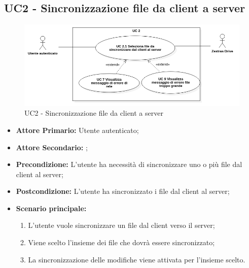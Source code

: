 \subsection{UC2 - Sincronizzazione file da client a server}
\begin{figure}[H]
    \centering
    \includegraphics[scale = 0.6]{components/img/UC2.png}
    \caption{UC2 - Sincronizzazione file da client a server}
\end{figure}
\begin{itemize}
\item \textbf{Attore Primario:} Utente autenticato;
\item \textbf{Attore Secondario:} ;
\item \textbf{Precondizione:} L'utente ha necessità di sincronizzare uno o più file dal client al server;
\item \textbf{Postcondizione:} L'utente ha sincronizzato i file dal client al server;
\item \textbf{Scenario principale:}
\begin{enumerate}
\item L'utente vuole sincronizzare un file dal client verso il server;
\item Viene scelto l'insieme dei file che dovrà essere sincronizzato;
\item La sincronizzazione delle modifiche viene attivata per l'insieme scelto.
\end{enumerate}
\end{itemize}
